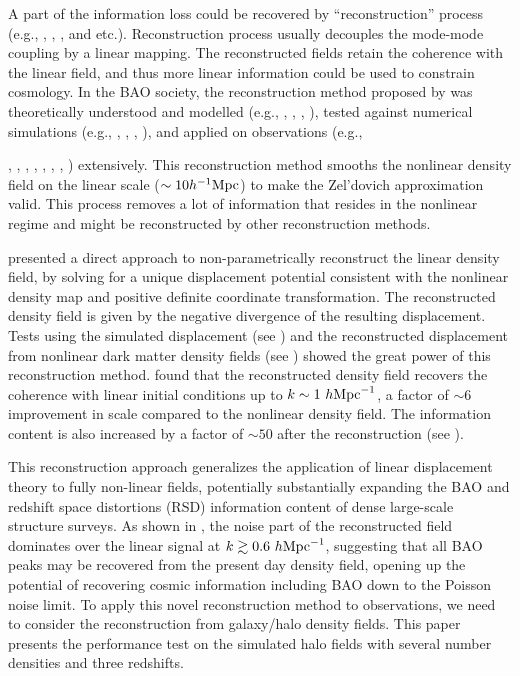 \documentclass[iop]{emulateapj}
\newcommand{\mpch}{h^{-1} {\rm Mpc}}
\newcommand{\hmpc}{h {\rm Mpc}^{-1}}
\begin{document}
A part of the information loss could be recovered by ``reconstruction'' process (e.g., \citet{Eisenstein07}, \cite{Schmittfull15}, \cite{Obuljen16}, and etc.).
Reconstruction process usually decouples the mode-mode coupling by a linear mapping.
The reconstructed fields retain the coherence with the linear field, and thus more linear information could be used to constrain cosmology.
In the BAO society, the reconstruction method proposed by \citet{Eisenstein07} was theoretically understood and modelled (e.g., \cite{Padmanabhan09}, \cite{Noh09}, \cite{White15}, \cite{Seo16}), tested against numerical simulations (e.g., \cite{Seo08}, \cite{Seo10}, \cite{Mehta11}, \cite{Achitouv15}), and applied on observations (e.g., {\cite{Padmanabhan12}, \cite{xuxy13}, \cite{Anderson14}, \cite{Kazin14}, \cite{Ross15}, \cite{Beutler16}, \cite{Hinton17}, \cite{Beutler17}) extensively.
This reconstruction method smooths the nonlinear density field on the linear scale ($\sim 10 \mpch$) to make the Zel'dovich approximation valid.
This process removes a lot of information that resides in the nonlinear regime and might be reconstructed by other reconstruction methods.

\citet{zhuhm16c} presented a direct approach to non-parametrically reconstruct the linear density field,
by solving for a unique displacement potential consistent with the nonlinear density map and positive definite coordinate transformation.
The reconstructed density field is given by the negative divergence of the resulting displacement.
Tests using the simulated displacement (see \cite{yuhr16}) and the reconstructed displacement from nonlinear dark matter density fields (see \cite{zhuhm16c}) showed the great power of this reconstruction method.
\citet{zhuhm16c} found that the reconstructed density field recovers the coherence with linear initial conditions up to $k\sim 1\ \hmpc$, a factor of $\sim 6$ improvement in scale compared to the nonlinear density field.
The information content is also increased by a factor of $\sim 50$ after the reconstruction (see \citet{panqy16}).

This reconstruction approach generalizes the application of linear displacement theory to fully non-linear fields, potentially substantially expanding the BAO and redshift space distortions (RSD) information content of dense large-scale structure surveys.
As shown in \citet{zhuhm16c}, the noise part of the reconstructed field dominates over the linear signal at $k\gtrsim0.6\ \hmpc$, suggesting that all BAO peaks may be recovered from the present day density field, opening up the potential of recovering cosmic information including BAO down to the Poisson noise limit.
To apply this novel reconstruction method to observations, we need to consider the reconstruction from galaxy/halo density fields. 
This paper presents the performance test on the simulated halo fields with several number densities and three redshifts.

}
\end{document}
